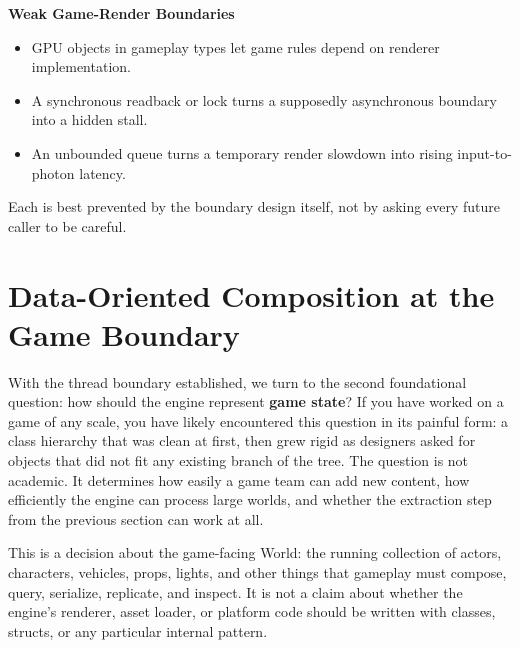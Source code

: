 \documentclass[
  11pt,
  letterpaper,
  DIV=11,
  numbers=noendperiod,
  twoside,
  open=right]{scrreprt}
\providecommand{\tightlist}{%
  \setlength{\itemsep}{0pt}\setlength{\parskip}{0pt}}
\begin{document}
\begin{tcolorbox}[enhanced jigsaw, arc=.35mm, bottomrule=.15mm, breakable, colback=white, colframe=quarto-callout-warning-color-frame, left=2mm, leftrule=.75mm, opacityback=0, rightrule=.15mm, toprule=.15mm]
\begin{minipage}[t]{5.5mm}
\textcolor{quarto-callout-warning-color}{\faExclamationTriangle}
\end{minipage}%
\begin{minipage}[t]{\textwidth - 5.5mm}

\vspace{-3mm}\textbf{Weak Game-Render Boundaries}\vspace{3mm}

\begin{itemize}
\tightlist
\item
  GPU objects in gameplay types let game rules depend on renderer
  implementation.
\item
  A synchronous readback or lock turns a supposedly asynchronous
  boundary into a hidden stall.
\item
  An unbounded queue turns a temporary render slowdown into rising
  input-to-photon latency.
\end{itemize}

Each is best prevented by the boundary design itself, not by asking
every future caller to be careful.

\end{minipage}%
\end{tcolorbox}

\section{Data-Oriented Composition at the Game
Boundary}\label{data-oriented-composition-at-the-game-boundary}

With the thread boundary established, we turn to the second foundational
question: how should the engine represent \textbf{game state}? If you
have worked on a game of any scale, you have likely encountered this
question in its painful form: a class hierarchy that was clean at first,
then grew rigid as designers asked for objects that did not fit any
existing branch of the tree. The question is not academic. It determines
how easily a game team can add new content, how efficiently the engine
can process large worlds, and whether the extraction step from the
previous section can work at all.

This is a decision about the game-facing World: the running collection
of actors, characters, vehicles, props, lights, and other things that
gameplay must compose, query, serialize, replicate, and inspect. It is
not a claim about whether the engine's renderer, asset loader, or
platform code should be written with classes, structs, or any particular
internal pattern.
\end{document}
